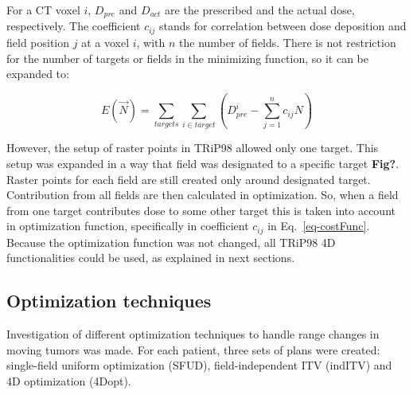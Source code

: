 \documentclass[type=dr, dr=rernat, accentcolor=tud7b,colorbacktitle, bigchapter, openright, twoside, 12pt ]{tudthesis}
\begin{document}
For a CT voxel $i$, $ D_{pre}$ and $D_{act}$ are the prescribed and the actual dose, respectively. The coefficient $c_{ij}$ stands for correlation between dose deposition and field position $j$ at a voxel $i$, with $n$ the number of fields. There is not restriction for the number of targets or fields in the minimizing function, so it can be expanded to:

\begin{equation}
\label{eq-multiCost}
 E(\vec{N}) = \sum_{targets} \sum_{i\in target} \left( D_{pre}^{i} -\sum_{j=1}^n c_{ij}N\right)
\end{equation}

However, the setup of raster points in TRiP98 allowed only one target. This setup was expanded in a way that field was designated to a specific target \textbf{Fig?}. Raster points for each field are still created only around designated target. Contribution from all fields are then calculated in optimization. So, when a field from one target contributes dose to some other target this is taken into account in optimization function, specifically in coefficient $c_{ij}$ in Eq.~\ref{eq-costFunc}. Because the optimization function was not changed, all TRiP98 4D functionalities could be used, as explained in next sections.

\subsection{Optimization techniques}

Investigation of different optimization techniques to handle range changes in moving tumors was made. For each patient, three sets of plans were created: single-field uniform optimization (SFUD), field-independent ITV (indITV) and 4D optimization (4Dopt). 
\end{document}
